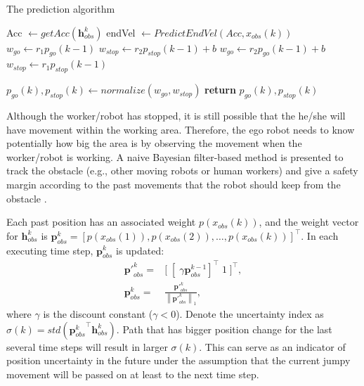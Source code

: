 \documentclass[letterpaper, 10 pt, conference]{ieeeconf}  %
\newcommand\norm[1]{\left\lVert#1\right\rVert}
\begin{document}
\begin{algorithm}
\caption{The prediction algorithm}\label{alg:euclid}
\begin{algorithmic}[1]
\State Acc $\gets getAcc(\mathbf{h}_{obs}^k)$
\State endVel $\gets PredictEndVel(Acc,x_{obs}(k))$
    \State $w_{go} \gets r_1p_{go}(k-1)$
    \State $w_{stop} \gets r_2p_{stop}(k-1)+b$
\Else
    \State $w_{go} \gets r_2p_{go}(k-1)+b$
    \State $w_{stop} \gets r_1p_{stop}(k-1)$
    
\EndIf
\State $p_{go}(k), p_{stop}(k) \gets normalize(w_{go},w_{stop})$
\State \textbf{return} $p_{go}(k), p_{stop}(k)$
\EndProcedure
\end{algorithmic}
\end{algorithm}

Although the worker/robot has stopped, it is still possible that the he/she will have movement within the working area. Therefore, the ego robot needs to know potentially how big the area is by observing the movement when the worker/robot is working. A naive Bayesian filter-based method is presented to track the obstacle (e.g., other moving robots or human workers) and give a safety margin according to the past movements that the robot should keep from the obstacle .

Each past position has an associated weight $p(x_{obs}(k))$, and the weight vector for $\mathbf{h}_{obs}^k$ is $\mathbf{p}_{obs}^k = [p(x_{obs}(1)), p(x_{obs}(2)),\ldots, p(x_{obs}(k))]^\top$. In each executing time step, $\mathbf{p}_{obs}^k$ is updated:
\begin{equation}
\begin{split}
\mathbf{p'}_{obs}^k =& \big[\;[\;\gamma\mathbf{p}_{obs}^{k-1}]^\top \;1\; \big]^\top, \\
\mathbf{p}_{obs}^k =& \frac{\mathbf{p'}_{obs}^k}{\norm{ \mathbf{p'}_{obs}^k }_1},
\end{split}
\end{equation}
where $\gamma$ is the discount constant ($\gamma < 0 $). Denote the uncertainty index as $\sigma(k) = std({\mathbf{p}_{obs}^k}^\top \mathbf{h}_{obs}^k)$. Path that has bigger position change for the last several time steps will result in larger $\sigma(k)$. This can serve as an indicator of position uncertainty in the future under the assumption that the current jumpy movement will be passed on at least to the next time step.  
\end{document}
